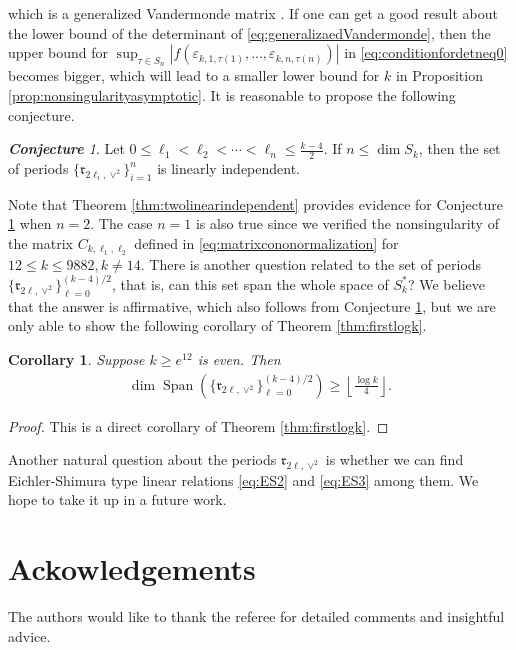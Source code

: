 \documentclass[11pt,letterpaper,reqno]{amsart}
\numberwithin{figure}{section}
\numberwithin{table}{section}
\theoremstyle{definition}
\theoremstyle{plain}
\newtheorem{corollary}{Corollary}[section]
\theoremstyle{definition}
\theoremstyle{definition}
\theoremstyle{remark}
\newtheorem{conjecture}[theorem]{\bf Conjecture}
\numberwithin{equation}{section}
\theoremstyle{remark}
\DeclareMathOperator{\Span}{Span}
\begin{document}
which is a generalized Vandermonde matrix \cite[Vol.2, p.99]{Gantmacher1959}. If one can get a good result about the lower bound of the determinant of \eqref{eq:generalizaedVandermonde}, then the upper bound for $\sup_{\tau\in S_n}|f(\varepsilon_{k,1,\tau(1)},...,\varepsilon_{k,n,\tau(n)})|$ in \eqref{eq:conditionfordetneq0} becomes bigger, which will lead to a smaller lower bound for $k$ in Proposition \ref{prop:nonsingularityasymptotic}.  It is reasonable to propose the following conjecture.
\begin{conjecture} \label{conj,1}
    Let $0\leq\ell_1<\ell_2<\cdots<\ell_n\leq\frac{k-4}{2}$. If $n\leq\dim S_k$, then the set of periods $\{\mathfrak{r}_{2\ell_i,\vee^2}\}_{i=1}^n$ is linearly independent.
\end{conjecture}


Note that Theorem \ref{thm:twolinearindependent} provides evidence for  Conjecture \ref{conj,1} when $n=2$. The case $n=1$ is also true since we verified the nonsingularity of the matrix $C_{k,\ell_1,\ell_2}$ defined in \eqref{eq:matrixcononormalization} for $12\leq k\leq 9882, k\neq14$.
There is another question related to the set of periods $\{\mathfrak{r}_{2\ell,\vee^2}\}_{\ell=0}^{(k-4)/2}$, that is, can this set span the whole space of $S_k^{\ast}$? We believe that the answer is affirmative, which also follows from Conjecture \ref{conj,1}, but we are only able to show the following corollary of Theorem \ref{thm:firstlogk}.

\begin{corollary}
    Suppose $k\ge e^{12}$ is even. Then
    \begin{align}
        \dim \Span\left( \{\mathfrak{r}_{2\ell,\vee^2}\}_{\ell=0}^{(k-4)/2}\right)\ge \left\lfloor\frac{\log k}{4}\right\rfloor.
    \end{align}
\end{corollary}
\begin{proof}
    This is a direct corollary of Theorem \ref{thm:firstlogk}.
\end{proof}

Another natural question about the periods $\mathfrak{r}_{2\ell,\vee^2}$ is whether we can find Eichler-Shimura 
type linear relations \eqref{eq:ES2} and \eqref{eq:ES3} among them. We hope to take it up in a future work.

\section*{Ackowledgements}
The authors would like to thank the referee for detailed comments and insightful advice.

  
  \vspace{.2in}

%
%



\providecommand{\bysame}{\leavevmode\hbox
to3em{\hrulefill}\thinspace}



\end{document}

